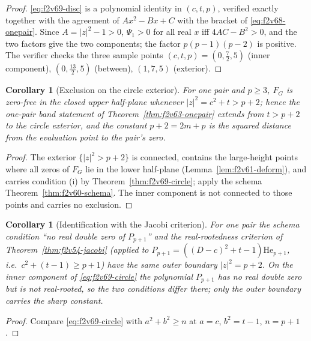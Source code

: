 \documentclass[11pt]{article}
\newtheorem{corollary}[theorem]{Corollary}
\theoremstyle{definition}
\theoremstyle{remark}
\begin{document}
\begin{proof}
\eqref{eq:f2v69-disc} is a polynomial identity in \((c,t,p)\), verified
exactly together with the agreement of \(Ax^2-Bx+C\) with the bracket of
\eqref{eq:f2v68-onepair}.  Since \(A=|z|^2-1>0\), \(\Psi_1>0\) for all
real \(x\) iff \(4AC-B^2>0\), and the two factors give the two
components; the factor \(p(p-1)(p-2)\) is positive.  The verifier checks
the three sample points \((c,t,p)=(0,\tfrac72,5)\) (inner component),
\((0,\tfrac{13}2,5)\) (between), \((1,7,5)\) (exterior).
\end{proof}

\begin{corollary}[Exclusion on the circle exterior]
\label{cor:f2v69-exterior}
For one pair and \(p\ge3\), \(F_G\) is zero-free in the closed upper
half-plane whenever \(|z|^2=c^2+t>p+2\); hence the one-pair band
statement of Theorem~\ref{thm:f2v63-onepair} extends from \(t>p+2\) to
the circle exterior, and the constant \(p+2=2m+p\) is the squared
distance from the evaluation point to the pair's zero.
\end{corollary}

\begin{proof}
The exterior \(\{|z|^2>p+2\}\) is connected, contains the large-height
points where all zeros of \(F_G\) lie in the lower half-plane
(Lemma~\ref{lem:f2v61-deform}), and carries condition (i) by
Theorem~\ref{thm:f2v69-circle}; apply the schema
Theorem~\ref{thm:f2v60-schema}.  The inner component is not connected to
those points and carries no exclusion.
\end{proof}

\begin{corollary}[Identification with the Jacobi criterion]
\label{cor:f2v69-jacobi}
For one pair the schema condition ``no real double zero of \(P_{p+1}\)''
and the real-rootedness criterion of Theorem~\ref{thm:f2v54-jacobi}
(applied to \(P_{p+1}=((D-c)^2+t-1)\mathrm{He}_{p+1}\), i.e.\
\(c^2+(t-1)\ge p+1\)) have the same outer boundary \(|z|^2=p+2\).  On the
inner component of \eqref{eq:f2v69-circle} the polynomial \(P_{p+1}\) has
no real double zero but is not real-rooted, so the two conditions differ
there; only the outer boundary carries the sharp constant.
\end{corollary}

\begin{proof}
Compare \eqref{eq:f2v69-circle} with \(a^2+b^2\ge n\) at \(a=c\),
\(b^2=t-1\), \(n=p+1\).
\end{proof}
\end{document}
